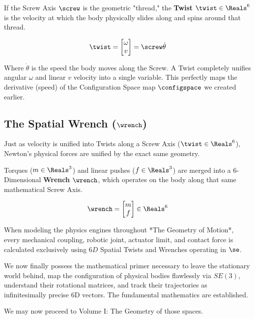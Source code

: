 If the Screw Axis $\screw$ is the geometric "thread," the \textbf{Twist} $\twist \in \Reals^6$ is the velocity at which the body physically slides along and spins around that thread.

\begin{equation}
   \twist = \begin{bmatrix} \omega \\ v \end{bmatrix} = \screw \dot{\theta} 
\end{equation}

Where $\dot{\theta}$ is the speed the body moves along the Screw. A Twist completely unifies angular $\omega$ and linear $v$ velocity into a single variable. This perfectly maps the derivative (speed) of the Configuration Space map $\configspace$ we created earlier.

\subsection{The Spatial Wrench ($\wrench$)}

Just as velocity is unified into Twists along a Screw Axis ($\twist \in \Reals^6$), Newton's physical forces are unified by the exact same geometry. 

Torques ($m \in \Reals^3$) and linear pushes ($f \in \Reals^3$) are merged into a 6-Dimensional \textbf{Wrench} $\wrench$, which operates on the body along that same mathematical Screw Axis.

\begin{equation}
   \wrench = \begin{bmatrix} m \\ f \end{bmatrix} \in \Reals^6
\end{equation}

When modeling the physics engines throughout *The Geometry of Motion*, every mechanical coupling, robotic joint, actuator limit, and contact force is calculated exclusively using $6D$ Spatial Twists and Wrenches operating in $\se$.

We now finally possess the mathematical primer necessary to leave the stationary world behind, map the configuration of physical bodies flawlessly via $SE(3)$, understand their rotational matrices, and track their trajectories as infinitesimally precise 6D vectors. The fundamental mathematics are established.

We may now proceed to Volume I: The Geometry of those spaces.
